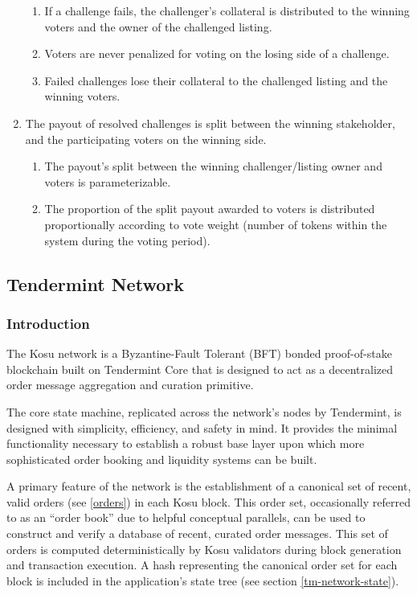 \documentclass[10pt]{article}
\begin{document}
\begin{enumerate}
\begin{enumerate}
    \item If a challenge fails, the challenger's collateral is distributed to the winning voters and the owner of the challenged listing. 
    \item Voters are never penalized for voting on the losing side of a challenge.
    \item Failed challenges lose their collateral to the challenged listing and the winning voters.
  \end{enumerate}
  \item The payout of resolved challenges is split between the winning stakeholder, and the participating voters on the winning side.
  \begin{enumerate}
    \item The payout's split between the winning challenger/listing owner and voters is parameterizable.
    \item The proportion of the split payout awarded to voters is distributed proportionally according to vote weight (number of tokens within the system during the voting period).
  \end{enumerate}
\end{enumerate}

\subsection{Tendermint Network}\label{tm-network}
\subsubsection{Introduction}\label{tm-network-intro}
The Kosu network is a Byzantine-Fault Tolerant (BFT) bonded proof-of-stake blockchain built on Tendermint Core that is designed to act as a decentralized order message aggregation and curation primitive\cite{bft, tendermint-wp}.
\medskip 

The core state machine, replicated across the network’s nodes by Tendermint, is designed with simplicity, efficiency, and safety in mind. It provides the minimal functionality necessary to establish a robust base layer upon which more sophisticated order booking and liquidity systems can be built.
\medskip

A primary feature of the network is the establishment of a canonical set of recent, valid  orders (see \ref{orders}) in each Kosu block. This order set, occasionally referred to as an ``order book'' due to helpful conceptual parallels, can be used to construct and verify a database of recent, curated order messages. This set of orders is computed deterministically by Kosu validators during block generation and transaction execution. A hash representing the canonical order set for each block is included in the application’s state tree (see section \ref{tm-network-state}).
\medskip
\end{document}
